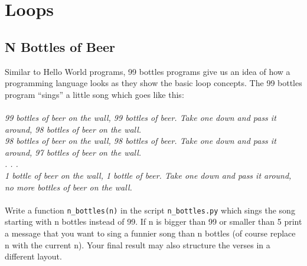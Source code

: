 \cprotect{}

\section{Loops}

\subsection{N Bottles of Beer}
Similar to Hello World programs, 99 bottles programs give us an idea of how
a programming language looks as they show the basic loop concepts.
The 99 bottles program “sings” a little song which goes like this:\\\\
\textit{
99 bottles of beer on the wall, 99 bottles of beer. Take one down and
pass it around, 98 bottles of beer on the wall.\\
98 bottles of beer on the wall, 98 bottles of beer. Take one down and
pass it around, 97 bottles of beer on the wall.\\
. . .\\
1 bottle of beer on the wall, 1 bottle of beer. Take one down and
pass it around, no more bottles of beer on the wall.\\\\
}
Write a function \texttt{n\_bottles(n)} in the script \texttt{n\_bottles.py} which
sings the song starting with n bottles instead of 99. If n is bigger than 99 or
smaller than 5 print a message that you want to sing a funnier song than n bottles
(of course replace n with the current n). Your final result may also structure
the verses in a different layout.

